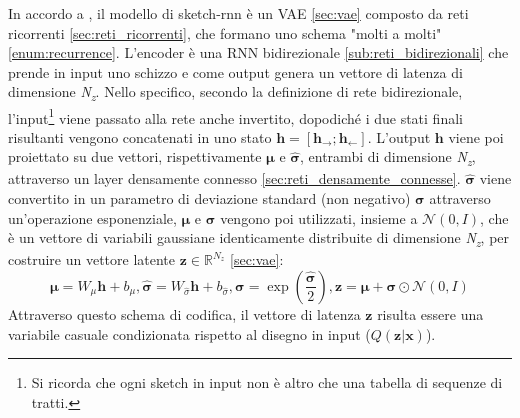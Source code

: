 In accordo a \cite{sketchrnn}, il modello di sketch-rnn è un VAE \ref{sec:vae} composto da reti ricorrenti \ref{sec:reti_ricorrenti}, che formano uno schema "molti a molti" \ref{enum:recurrence}. L'encoder è una RNN bidirezionale \ref{sub:reti_bidirezionali} che prende in input uno schizzo e come output genera un vettore di latenza di dimensione \textit{N\textsubscript{z}}. Nello specifico, secondo la definizione di rete bidirezionale, l'input\footnote{Si ricorda che ogni sketch in input non è altro che una tabella di sequenze di tratti.} viene passato alla rete anche invertito, dopodiché i due stati finali risultanti vengono concatenati in uno stato $\boldsymbol{h} = [\boldsymbol{h_\rightarrow} ; \boldsymbol{h_\leftarrow}]$. L'output $\boldsymbol{h}$ viene poi proiettato su due vettori, rispettivamente $\boldsymbol{\mu}$ e $\boldsymbol{\hat\sigma}$, entrambi di dimensione \textit{N\textsubscript{z}}, attraverso un layer densamente connesso \ref{sec:reti_densamente_connesse}. $\boldsymbol{\hat\sigma}$ viene convertito in un parametro di deviazione standard (non negativo) $\boldsymbol{\sigma}$ attraverso un'operazione esponenziale, $\boldsymbol{\mu}$ e $\boldsymbol{\sigma}$ vengono poi utilizzati, insieme a $\mathcal{N}(0, I)$, che è un vettore di variabili gaussiane identicamente distribuite di dimensione \textit{N\textsubscript{z}}, per costruire un vettore latente $\boldsymbol{z} \in \mathbb{R}^{N_z}$ \ref{sec:vae}:
\begin{equation}
	\label{repar_trick}
	\boldsymbol{\mu} = W_\mu \boldsymbol{h} + b_\mu, \boldsymbol{\hat\sigma} = W_{\hat\sigma} \boldsymbol{h} + b_{\hat\sigma}, \boldsymbol{\sigma} = \exp (\frac{\boldsymbol{\hat\sigma}}{2}), \boldsymbol{z} = \boldsymbol{\mu} + \boldsymbol{\sigma} \odot \mathcal{N}(0, I)
\end{equation}
Attraverso questo schema di codifica, il vettore di latenza $\boldsymbol{z}$ risulta essere una variabile casuale condizionata rispetto al disegno in input ($Q(\boldsymbol{z} | \boldsymbol{x})$).

